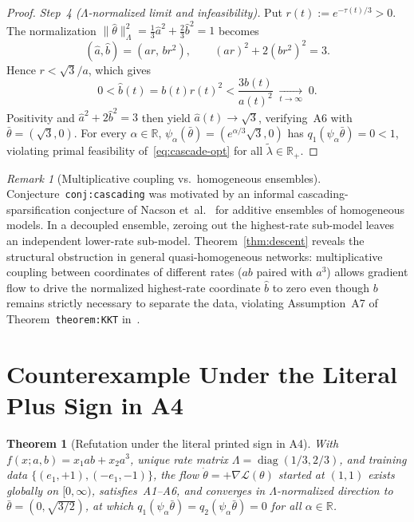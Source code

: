 \documentclass[11pt]{article}
\theoremstyle{plain}
\newtheorem{theorem}{Theorem}
\theoremstyle{definition}
\theoremstyle{remark}
\newtheorem{remark}{Remark}
\DeclareMathOperator{\diag}{diag}
\begin{document}
\begin{proof}
\emph{Step~4 ($\Lambda$-normalized limit and infeasibility).} Put $r(t) := e^{-\tau(t)/3} > 0$. The normalization $\|\hat{\theta}\|_\Lambda^2 = \frac{1}{3}\hat{a}^2 + \frac{2}{3}\hat{b}^2 = 1$ becomes
\[
(\hat{a}, \hat{b}) = (ar,\, br^2), \qquad (ar)^2 + 2(br^2)^2 = 3.
\]
Hence $r < \sqrt{3}/a$, which gives
\[
0 < \hat{b}(t) = b(t) r(t)^2 < \frac{3 b(t)}{a(t)^2} \;\xrightarrow[t \to \infty]{}\; 0.
\]
Positivity and $\hat{a}^2 + 2\hat{b}^2 = 3$ then yield $\hat{a}(t) \to \sqrt{3}$, verifying~A6 with $\bar{\theta} = (\sqrt{3}, 0)$. For every $\alpha \in \mathbb{R}$, $\psi_\alpha(\bar{\theta}) = (e^{\alpha/3}\sqrt{3}, 0)$ has $q_1(\psi_\alpha \bar{\theta}) = 0 < 1$, violating primal feasibility of~\eqref{eq:cascade-opt} for all $\tilde{\lambda} \in \mathbb{R}_+$.
\end{proof}

\begin{remark}[Multiplicative coupling vs.\ homogeneous ensembles]
Conjecture~\texttt{conj:cascading} was motivated by an informal cascading-sparsification conjecture of Nacson et~al.~\cite{Nacson2019} for additive ensembles of homogeneous models. In a decoupled ensemble, zeroing out the highest-rate sub-model leaves an independent lower-rate sub-model. Theorem~\ref{thm:descent} reveals the structural obstruction in general quasi-homogeneous networks: multiplicative coupling between coordinates of different rates ($ab$ paired with $a^3$) allows gradient flow to drive the normalized highest-rate coordinate $\hat{b}$ to zero even though $b$ remains strictly necessary to separate the data, violating Assumption~A7 of Theorem~\texttt{theorem:KKT} in~\cite{Kunin2023}.
\end{remark}

\section{Counterexample Under the Literal Plus Sign in A4}

\begin{theorem}[Refutation under the literal printed sign in A4]\label{thm:ascent}
With $f(x; a, b) = x_1 ab + x_2 a^3$, unique rate matrix $\Lambda = \diag(1/3, 2/3)$, and training data $\{(e_1, +1), (-e_1, -1)\}$, the flow $\dot{\theta} = +\nabla \mathcal{L}(\theta)$ started at $(1, 1)$ exists globally on $[0, \infty)$, satisfies~A1--A6, and converges in $\Lambda$-normalized direction to $\bar{\theta} = (0, \sqrt{3/2})$, at which $q_1(\psi_\alpha \bar{\theta}) = q_2(\psi_\alpha \bar{\theta}) = 0$ for all $\alpha \in \mathbb{R}$.
\end{theorem}
\end{document}
